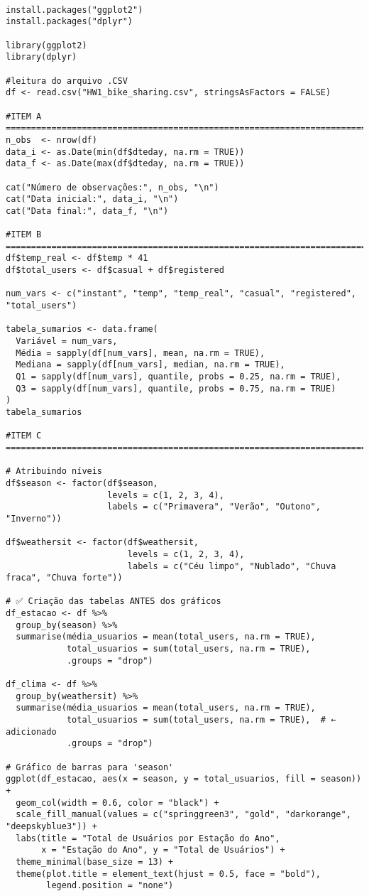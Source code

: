 \documentclass[a4paper,11pt]{article}
\begin{document}
\begin{lstlisting}

install.packages("ggplot2")
install.packages("dplyr")

library(ggplot2)
library(dplyr)

#leitura do arquivo .CSV
df <- read.csv("HW1_bike_sharing.csv", stringsAsFactors = FALSE)

#ITEM A =======================================================================================
n_obs  <- nrow(df) 
data_i <- as.Date(min(df$dteday, na.rm = TRUE)) 
data_f <- as.Date(max(df$dteday, na.rm = TRUE))

cat("Número de observações:", n_obs, "\n")
cat("Data inicial:", data_i, "\n")
cat("Data final:", data_f, "\n")

#ITEM B =======================================================================================
df$temp_real <- df$temp * 41
df$total_users <- df$casual + df$registered

num_vars <- c("instant", "temp", "temp_real", "casual", "registered", "total_users")

tabela_sumarios <- data.frame(
  Variável = num_vars,
  Média = sapply(df[num_vars], mean, na.rm = TRUE),
  Mediana = sapply(df[num_vars], median, na.rm = TRUE),
  Q1 = sapply(df[num_vars], quantile, probs = 0.25, na.rm = TRUE),
  Q3 = sapply(df[num_vars], quantile, probs = 0.75, na.rm = TRUE)
)
tabela_sumarios

#ITEM C =======================================================================================

# Atribuindo níveis
df$season <- factor(df$season,
                    levels = c(1, 2, 3, 4),
                    labels = c("Primavera", "Verão", "Outono", "Inverno"))

df$weathersit <- factor(df$weathersit,
                        levels = c(1, 2, 3, 4),
                        labels = c("Céu limpo", "Nublado", "Chuva fraca", "Chuva forte"))

# ✅ Criação das tabelas ANTES dos gráficos
df_estacao <- df %>%
  group_by(season) %>%
  summarise(média_usuarios = mean(total_users, na.rm = TRUE),
            total_usuarios = sum(total_users, na.rm = TRUE),
            .groups = "drop")

df_clima <- df %>%
  group_by(weathersit) %>%
  summarise(média_usuarios = mean(total_users, na.rm = TRUE),
            total_usuarios = sum(total_users, na.rm = TRUE),  # ← adicionado
            .groups = "drop")

# Gráfico de barras para 'season'
ggplot(df_estacao, aes(x = season, y = total_usuarios, fill = season)) +
  geom_col(width = 0.6, color = "black") +
  scale_fill_manual(values = c("springgreen3", "gold", "darkorange", "deepskyblue3")) +
  labs(title = "Total de Usuários por Estação do Ano",
       x = "Estação do Ano", y = "Total de Usuários") +
  theme_minimal(base_size = 13) +
  theme(plot.title = element_text(hjust = 0.5, face = "bold"),
        legend.position = "none")


\end{lstlisting}
\end{document}
